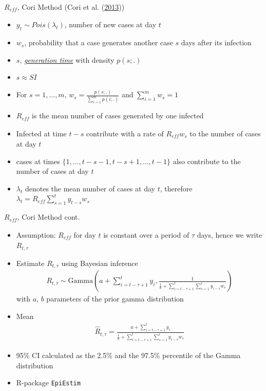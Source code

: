 \documentclass[
  ignorenonframetext,
  aspectratio=169,
]{beamer}
\newcommand{\mli}[1]{\mathit{#1}}%
\newcommand{\R}{\textsf{R}}
\begin{document}
\begin{frame}{\(R_\mli{eff}\), Cori Method (Cori et al.
(\protect\hyperlink{ref-cori2013}{2013}))}
\protect\hypertarget{r_mlieff-cori-method-cori2013}{}
\begin{itemize}
\item $y_t \sim Pois(\lambda_t)$, number of new cases at day $t$
\item $w_s$, probability that a case generates another case $s$ days after its infection
\item $s$, \underline{\textit{generation time}} with density $p(s;.)$
\item $s \approx SI$
\item For $s = 1, \dots, m$, $w_s = \frac{p(s;.)}{\sum_{i=1}^m p(i;.)}$ and $\sum_{i = 1}^m w_s = 1$
\item $R_\mli{eff}$ is the mean number of cases generated by one infected
\item Infected at time $t-s$ contribute with a rate of $R_\mli{eff}w_s$ to the number of cases at day $t$
\item cases at times $\{1,\dots, t-s-1, t-s+1,\dots, t-1\}$ also contribute to the number of cases at day $t$
\item $\lambda_t$ denotes the mean number of cases at day $t$, therefore $\lambda_t = R_\mli{eff} \sum_{s=1}^t y_{t-s}w_s$
\end{itemize}
\end{frame}

\begin{frame}{\(R_\mli{eff}\), Cori Method cont.}
\protect\hypertarget{r_mlieff-cori-method-cont.}{}
\begin{itemize}
\item Assumption: $R_\mli{eff}$ for day $t$ is constant over a period of $\tau$ days, hence we write $R_{t,\tau}$
\item Estimate $R_{t,\tau}$ using Bayesian inference
\begin{align*}
  R_{t,\tau} \sim \text{Gamma}\left(a+\sum_{i=t-\tau+1}^t y_i, \frac{1}{\frac{1}{b} + \sum_{i=t-\tau+1}^t \sum_{s=1}^i y_{i-s}w_s}\right)
\end{align*}
with $a$, $b$ parameters of the prior gamma distribution
\item Mean
\begin{align*}
  \hat{R}_{t,\tau} = \frac{a+\sum_{i=t-\tau+1}^t y_i}{\frac{1}{b} + \sum_{i=t-\tau+1}^t \sum_{s=1}^i y_{i-s}w_s}
\end{align*}
\item 95\% CI calculated as the 2.5\% and the 97.5\% percentile of the Gamma distribution 
\item \R{}-package \texttt{EpiEstim}
\end{itemize}
\end{frame}
\end{document}
